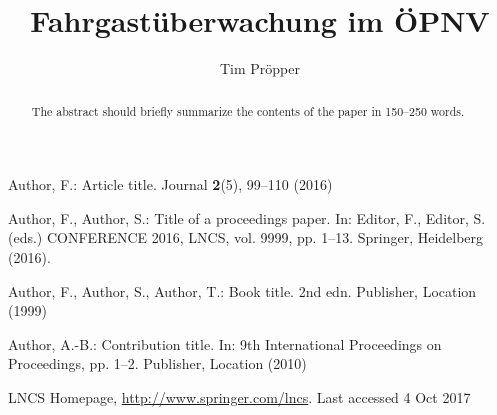 \documentclass[runningheads]{llncs}
\begin{document}
\title{Fahrgastüberwachung im ÖPNV}
\author{Tim Pröpper}

{\def\addcontentsline#1#2#3{}\maketitle}            %


\begin{abstract}
    The abstract should briefly summarize the contents of the paper in
    150--250 words.

\end{abstract}

\setcounter{tocdepth}{2}
\tableofcontents
\setcounter{page}{0}







\begin{thebibliography}{99}
    Author, F.: Article title. Journal \textbf{2}(5), 99--110 (2016)

    Author, F., Author, S.: Title of a proceedings paper. In: Editor,
    F., Editor, S. (eds.) CONFERENCE 2016, LNCS, vol. 9999, pp. 1--13.
    Springer, Heidelberg (2016). 

    Author, F., Author, S., Author, T.: Book title. 2nd edn. Publisher,
    Location (1999)

    Author, A.-B.: Contribution title. In: 9th International Proceedings
    on Proceedings, pp. 1--2. Publisher, Location (2010)

    LNCS Homepage, \url{http://www.springer.com/lncs}. Last accessed 4
    Oct 2017
\end{thebibliography}
\end{document}
